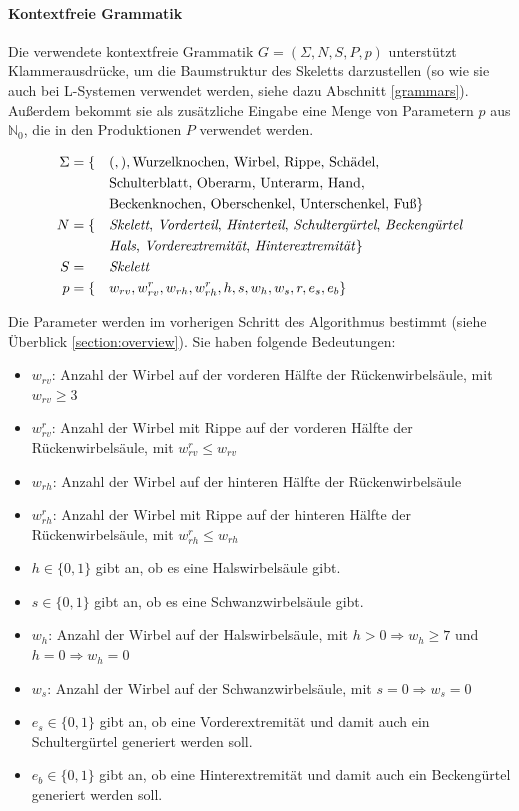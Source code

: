 \paragraph{Kontextfreie Grammatik}
Die verwendete kontextfreie Grammatik $G = (\Sigma, N, S, P, p)$ unterstützt Klammerausdrücke, um die Baumstruktur des Skeletts darzustellen (so wie sie auch bei L-Systemen verwendet werden, siehe dazu Abschnitt \ref{grammars}). Außerdem bekommt sie als zusätzliche Eingabe eine Menge von Parametern $p$ aus $\mathbb{N}_0$, die in den Produktionen $P$ verwendet werden.

\begin{alignat*}{2}
 \Sigma & = \{&&(, ), \text{Wurzelknochen, Wirbel, Rippe, Schädel,}\\  
        & &&\text{Schulterblatt, Oberarm, Unterarm, Hand,}\\ 
        & &&\text{Beckenknochen, Oberschenkel, Unterschenkel, Fuß}\}\\
 N &= \{&&\text{\emph{Skelett}, \emph{Vorderteil}, \emph{Hinterteil}, \emph{Schultergürtel}, \emph{Beckengürtel}}\\
        & &&\text{\emph{Hals}, \emph{Vorderextremität}, \emph{Hinterextremität}}\}\\
 S &= &&\text{\emph{Skelett}}\\
 p &= \{&&w_{rv}, w_{rv}^r, w_{rh}, w_{rh}^r, h, s, w_h, w_s, r, e_s, e_b \}
\end{alignat*}

Die Parameter werden im vorherigen Schritt des Algorithmus bestimmt (siehe Überblick \ref{section:overview}). Sie haben folgende Bedeutungen:
\begin{itemize}
 \item $w_{rv}$: Anzahl der Wirbel auf der vorderen Hälfte der Rückenwirbelsäule, mit $w_{rv} \geq 3$
 \item $w_{rv}^r$: Anzahl der Wirbel mit Rippe auf der vorderen Hälfte der Rückenwirbelsäule, mit $w_{rv}^r \leq w_{rv}$
 \item $w_{rh}$: Anzahl der Wirbel auf der hinteren Hälfte der Rückenwirbelsäule
 \item $w_{rh}^r$: Anzahl der Wirbel mit Rippe auf der hinteren Hälfte der Rückenwirbelsäule, mit $w_{rh}^r \leq w_{rh}$
 \item $h \in \{0,1\}$ gibt an, ob es eine Halswirbelsäule gibt.
 \item $s \in \{0,1\}$ gibt an, ob es eine Schwanzwirbelsäule gibt.
 \item $w_h$: Anzahl der Wirbel auf der Halswirbelsäule, mit $h > 0 \Rightarrow w_h \geq 7$ und \mbox{$h = 0 \Rightarrow w_h = 0$}
 \item $w_s$: Anzahl der Wirbel auf der Schwanzwirbelsäule, mit $s = 0 \Rightarrow w_s = 0$
 \item $e_s \in \{0, 1\}$ gibt an, ob eine Vorderextremität und damit auch ein Schultergürtel generiert werden soll.
 \item $e_b \in \{0, 1\}$ gibt an, ob eine Hinterextremität und damit auch ein Beckengürtel generiert werden soll.
\end{itemize}

